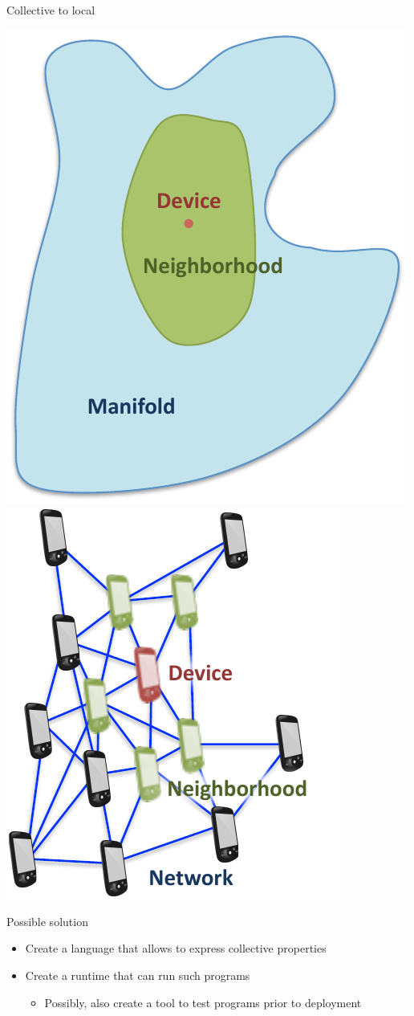 \documentclass[presentation]{beamer} %
\begin{document}
\begin{frame}{Collective to local}
   \begin{center}
      \includegraphics[width=.3\textwidth{}]{imgs/space-continuous}
      \hspace{1cm}
      \includegraphics[width=.3\textwidth{}]{imgs/space-discrete}
   \end{center}
  \begin{block}{Possible solution}
    \begin{itemize}
      \item Create a language that allows to express collective properties
      \item Create a runtime that can run such programs
      \begin{itemize}
         \item Possibly, also create a tool to test programs prior to deployment
      \end{itemize}
    \end{itemize}
  \end{block}
\end{frame}
\end{document}
